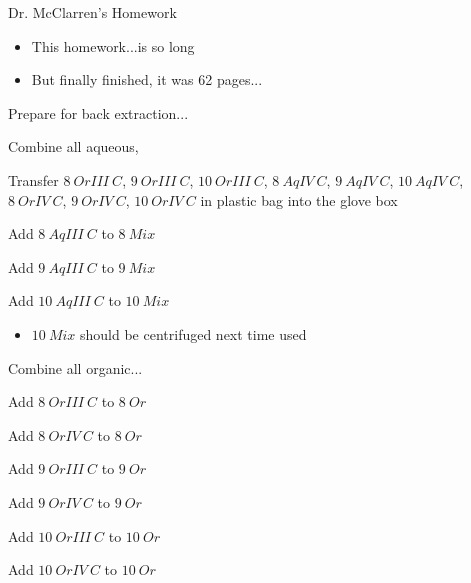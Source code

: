 \documentclass[idxtotoc,hyperref,openany,oneside]{labbook} %
\newcommand{\cmark}{\ding{51}}%
\newcommand{\done}{\rlap{$\square$}{\raisebox{2pt}{\large\hspace{1pt}\cmark}}%
  \hspace{-2.5pt}}
\begin{document}



\begin{todolist}
\item[\done]{Dr. McClarren's Homework}
  \begin{itemize}
  \item{This homework...is so long}
  \item{But finally finished, it was 62 pages...}
  \end{itemize}
\end{todolist}





Prepare for back extraction...

Combine all aqueous,

\begin{todolist}
\item[\done]{Transfer $\boxed{8\ OrIII\ C}$, $\boxed{9\ OrIII\ C}$,
  $\boxed{10\ OrIII\ C}$,
  $\boxed{8\ AqIV\ C}$, $\boxed{9\ AqIV\ C}$,
  $\boxed{10\ AqIV\ C}$,
  $\boxed{8\ OrIV\ C}$, $\boxed{9\ OrIV\ C}$,
  $\boxed{10\ OrIV\ C}$ in plastic bag into the glove box}
\item[\done]{Add $\boxed{8\ AqIII\ C}$ to $\boxed{8\ Mix}$}
\item[\done]{Add $\boxed{9\ AqIII\ C}$ to $\boxed{9\ Mix}$}
\item[\done]{Add $\boxed{10\ AqIII\ C}$ to $\boxed{10\ Mix}$}
  \begin{itemize}
  \item{$\boxed{10\ Mix}$ should be centrifuged next time used}
  \end{itemize}
\end{todolist}

Combine all organic...

\begin{todolist}
\item[\done]{Add $\boxed{8\ OrIII\ C}$ to $\boxed{8\ Or}$}
\item[\done]{Add $\boxed{8\ OrIV\ C}$ to $\boxed{8\ Or}$}
\item[\done]{Add $\boxed{9\ OrIII\ C}$ to $\boxed{9\ Or}$}
\item[\done]{Add $\boxed{9\ OrIV\ C}$ to $\boxed{9\ Or}$}
\item[\done]{Add $\boxed{10\ OrIII\ C}$ to $\boxed{10\ Or}$}
\item[\done]{Add $\boxed{10\ OrIV\ C}$ to $\boxed{10\ Or}$}
\end{todolist}
\end{document}
